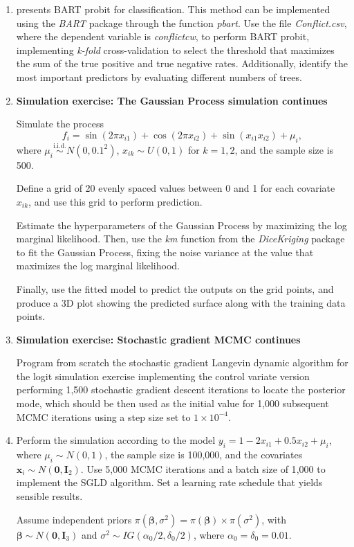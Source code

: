 \begin{enumerate}
	\item \cite{chipman2010bart} presents BART probit for classification. This method can be implemented using the \textit{BART} package through the function \textit{pbart}. Use the file \textit{Conflict.csv}, where the dependent variable is \textit{conflictcw}, to perform BART probit, implementing \textit{k-fold} cross-validation to select the threshold that maximizes the sum of the true positive and true negative rates. Additionally, identify the most important predictors by evaluating different numbers of trees.
	
	
	\item \textbf{Simulation exercise: The Gaussian Process simulation continues}
	
	Simulate the process
	\[
	f_i = \sin(2\pi x_{i1}) + \cos(2\pi x_{i2}) + \sin(x_{i1} x_{i2}) + \mu_i,
	\]
	where \( \mu_i \overset{\text{i.i.d.}}{\sim} {N}(0, 0.1^2) \), \( x_{ik} \sim {U}(0,1) \) for \( k = 1, 2 \), and the sample size is 500. 
	
	Define a grid of 20 evenly spaced values between 0 and 1 for each covariate \( x_{ik} \), and use this grid to perform prediction.
	
	Estimate the hyperparameters of the Gaussian Process by maximizing the log marginal likelihood. Then, use the \textit{km} function from the \textit{DiceKriging} package to fit the Gaussian Process, fixing the noise variance at the value that maximizes the log marginal likelihood.
	
	Finally, use the fitted model to predict the outputs on the grid points, and produce a 3D plot showing the predicted surface along with the training data points.
	
	\item \textbf{Simulation exercise: Stochastic gradient MCMC continues} 
	
	Program from scratch the stochastic gradient Langevin dynamic algorithm for the logit simulation exercise implementing the control variate version performing 1{,}500 stochastic gradient descent iterations to locate the posterior mode, which should be then used as the initial value for 1{,}000 subsequent MCMC iterations using a step size set to \(1 \times 10^{-4}\).
	
	\item Perform the simulation according to the model \( y_i = 1 - 2 x_{i1} + 0.5 x_{i2} + \mu_i \), where \( \mu_i \sim {N}(0,1) \), the sample size is 100{,}000, and the covariates \( \mathbf{x}_i \sim {N}(\mathbf{0}, \mathbf{I}_2) \). Use 5{,}000 MCMC iterations and a batch size of 1{,}000 to implement the SGLD algorithm. Set a learning rate schedule that yields sensible results.
	
	Assume independent priors \( \pi(\boldsymbol{\beta}, \sigma^2) = \pi(\boldsymbol{\beta}) \times \pi(\sigma^2) \), with \( \boldsymbol{\beta} \sim {N}(\mathbf{0}, \mathbf{I}_3) \) and \( \sigma^2 \sim {IG}(\alpha_0/2, \delta_0/2) \), where \( \alpha_0 = \delta_0 = 0.01 \).
	
	
	  
\end{enumerate}


